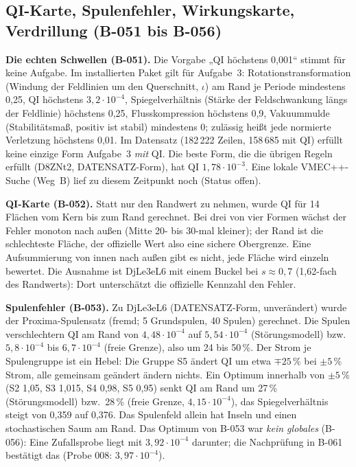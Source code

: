 \subsection{QI-Karte, Spulenfehler, Wirkungskarte, Verdrillung (B-051 bis B-056)}
\textbf{Die echten Schwellen (B-051).} Die Vorgabe „QI höchstens 0,001“ stimmt für keine Aufgabe. Im installierten Paket gilt für
Aufgabe~3: Rotationstransformation (Windung der Feldlinien um den Querschnitt, $\iota$) am Rand je Periode mindestens 0,25, QI höchstens $3{,}2\cdot10^{-4}$, Spiegelverhältnis (Stärke der Feldschwankung längs der Feldlinie) höchstens 0,25, Flusskompression
höchstens 0,9, Vakuummulde (Stabilitätsmaß, positiv ist stabil) mindestens 0; zulässig heißt jede normierte Verletzung höchstens 0,01. Im Datensatz (182\,222 Zeilen, 158\,685 mit QI) erfüllt
keine einzige Form Aufgabe~3 \emph{mit} QI. Die beste Form, die die übrigen Regeln erfüllt (D8ZNt2, DATENSATZ-Form), hat QI $1{,}78\cdot10^{-3}$. Eine lokale
VMEC++-Suche (Weg~B) lief zu diesem Zeitpunkt noch (Status offen).

\textbf{QI-Karte (B-052).} Statt nur den Randwert zu nehmen, wurde QI für 14 Flächen vom Kern bis zum Rand gerechnet. Bei drei von vier
Formen wächst der Fehler monoton nach außen (Mitte 20- bis 30-mal kleiner); der Rand ist die schlechteste Fläche, der offizielle Wert also eine sichere Obergrenze.
Eine Aufsummierung von innen nach außen gibt es nicht, jede Fläche wird einzeln bewertet. Die Ausnahme ist DjLe3eL6 mit einem Buckel bei $s\approx0{,}7$
(1,62-fach des Randwerts): Dort unterschätzt die offizielle Kennzahl den Fehler.

\textbf{Spulenfehler (B-053).} Zu DjLe3eL6 (DATENSATZ-Form, unverändert) wurde der Proxima-Spulensatz (fremd; 5 Grundspulen, 40 Spulen) gerechnet. Die
Spulen verschlechtern QI am Rand von $4{,}48\cdot10^{-4}$ auf $5{,}54\cdot10^{-4}$ (Störungsmodell) bzw.\ $5{,}8\cdot10^{-4}$ bis $6{,}7\cdot10^{-4}$ (freie Grenze), also um 24 bis 50\,\%. Der Strom je Spulengruppe ist ein
Hebel: Die Gruppe S5 ändert QI um etwa $\mp25$\,\% bei $\pm5$\,\% Strom, alle gemeinsam geändert ändern nichts. Ein Optimum innerhalb von $\pm5$\,\% (S2 1,05, S3 1,015, S4 0,98,
S5 0,95) senkt QI am Rand um 27\,\% (Störungsmodell) bzw.\ 28\,\% (freie Grenze, $4{,}15\cdot10^{-4}$), das Spiegelverhältnis steigt von 0,359 auf 0,376. Das
Spulenfeld allein hat Inseln und einen stochastischen Saum am Rand. Das Optimum von B-053 war \emph{kein globales} (B-056): Eine Zufallsprobe liegt mit
$3{,}92\cdot10^{-4}$ darunter; die Nachprüfung in B-061 bestätigt das (Probe 008: $3{,}97\cdot10^{-4}$).

